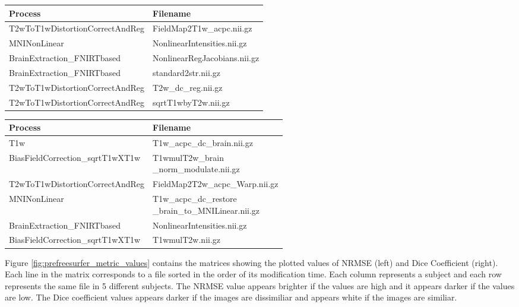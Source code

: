 \hfill \break
\fi

\hfill \break
\begin{center}
\begin{tabular}{|l|l|}
\hline
\textbf{Process}      & \textbf{Filename} \\ \hline
T2wToT1wDistortionCorrectAndReg               & FieldMap2T1w\_acpc.nii.gz    \\ \hline
MNINonLinear             & NonlinearIntensities.nii.gz    \\ \hline
BrainExtraction\_FNIRTbased & NonlinearRegJacobians.nii.gz   \\ \hline
BrainExtraction\_FNIRTbased & standard2str.nii.gz \\ \hline
T2wToT1wDistortionCorrectAndReg & T2w\_dc\_reg.nii.gz \\ \hline
T2wToT1wDistortionCorrectAndReg & sqrtT1wbyT2w.nii.gz \\ \hline
\end{tabular}
\label{tab:PreFreeSurfer_NRMSE_processes}
\end{center}
\hfill \break

\hfill \break
\begin{center}
\begin{tabular}{|l|l|}
\hline
\textbf{Process}      & \textbf{Filename} \\ \hline
T1w              & T1w\_acpc\_dc\_brain.nii.gz    \\ \hline
BiasFieldCorrection\_sqrtT1wXT1w             & \makecell[l]{T1wmulT2w\_brain\\\_norm\_modulate.nii.gz}    \\ \hline
T2wToT1wDistortionCorrectAndReg & FieldMap2T2w\_acpc\_Warp.nii.gz   \\ \hline
MNINonLinear & \makecell[l]{T1w\_acpc\_dc\_restore\\\_brain\_to\_MNILinear.nii.gz} \\ \hline
BrainExtraction\_FNIRTbased & NonlinearIntensities.nii.gz \\ \hline
BiasFieldCorrection\_sqrtT1wXT1w & T1wmulT2w.nii.gz \\ \hline
\end{tabular}
\label{tab:PreFreeSurfer_NRMSE_processes}
\end{center}
\hfill \break

Figure \ref{fig:prefreesurfer_metric_values} contains the matrices showing the plotted values of NRMSE (left) and Dice Coefficient (right). Each line in the matrix corresponds to a file sorted in the order of its modification time. Each column represents a subject and each row represents the same file in 5 different subjects. The NRMSE value appears brighter if the values are high and it appears darker if the values are low. The Dice coefficient values appears darker if the images are dissimiliar and appears white if the images are similiar.

